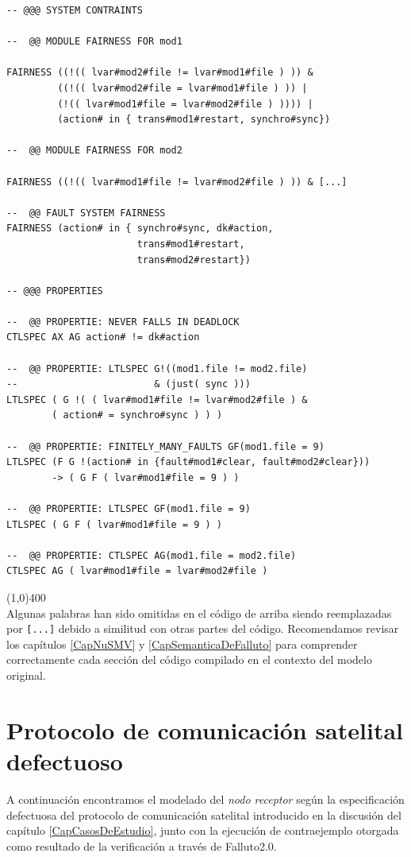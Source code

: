 \documentclass[pdftex,a4paper,12pt]{book}
\begin{document}
\begin{verbatim}
-- @@@ SYSTEM CONTRAINTS

--  @@ MODULE FAIRNESS FOR mod1

FAIRNESS ((!(( lvar#mod2#file != lvar#mod1#file ) )) &
         ((!(( lvar#mod2#file = lvar#mod1#file ) )) |
         (!(( lvar#mod1#file = lvar#mod2#file ) )))) |
         (action# in { trans#mod1#restart, synchro#sync})

--  @@ MODULE FAIRNESS FOR mod2

FAIRNESS ((!(( lvar#mod1#file != lvar#mod2#file ) )) & [...]

--  @@ FAULT SYSTEM FAIRNESS
FAIRNESS (action# in { synchro#sync, dk#action, 
                       trans#mod1#restart, 
                       trans#mod2#restart})

-- @@@ PROPERTIES 

--  @@ PROPERTIE: NEVER FALLS IN DEADLOCK
CTLSPEC AX AG action# != dk#action

--  @@ PROPERTIE: LTLSPEC G!((mod1.file != mod2.file) 
--                        & (just( sync )))
LTLSPEC ( G !( ( lvar#mod1#file != lvar#mod2#file ) &
        ( action# = synchro#sync ) ) ) 

--  @@ PROPERTIE: FINITELY_MANY_FAULTS GF(mod1.file = 9)
LTLSPEC (F G !(action# in {fault#mod1#clear, fault#mod2#clear}))
        -> ( G F ( lvar#mod1#file = 9 ) ) 

--  @@ PROPERTIE: LTLSPEC GF(mod1.file = 9)
LTLSPEC ( G F ( lvar#mod1#file = 9 ) ) 

--  @@ PROPERTIE: CTLSPEC AG(mod1.file = mod2.file)
CTLSPEC AG ( lvar#mod1#file = lvar#mod2#file ) 
\end{verbatim}
\noindent \line(1,0){400}\\

Algunas palabras han sido omitidas en el c\'odigo de arriba siendo reemplazadas por  \texttt{[...]} debido a similitud con otras partes del c\'odigo. Recomendamos revisar los cap\'itulos \ref{CapNuSMV} y \ref{CapSemanticaDeFalluto} para comprender correctamente cada secci\'on del c\'odigo compilado en el contexto del modelo original.

\chapter{Protocolo de comunicaci\'on satelital defectuoso}
\label{ApProtDef}
A continuaci\'on encontramos el modelado del \textit{nodo receptor} seg\'un la especificaci\'on defectuosa del protocolo de comunicaci\'on satelital introducido en la discusi\'on del cap\'itulo \ref{CapCasosDeEstudio}, junto con la ejecuci\'on de contraejemplo otorgada como resultado de la verificaci\'on a trav\'es de Falluto2.0.
\end{document}
